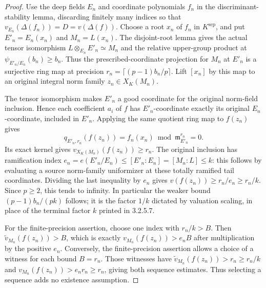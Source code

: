 \begin{proof}
Use the deep fields $E_n$ and coordinate polynomials $f_n$ in the
discriminant-stability lemma, discarding finitely many indices so that
$v_{E_n}(\Delta(f_n))=D=v(\Delta(f))$. Choose a root $x_n$ of $f_n$
in $K^{\mathrm{sep}}$, and put $E'_n=E_n(x_n)$ and $M_n=L(x_n)$.
The disjoint-root lemma gives the actual tensor isomorphism
$L\otimes_{E_n}E'_n\simeq M_n$ and the relative upper-group product
at $\psi_{E'_n/E_n}(b_n)\geq b_n$. Thus the prescribed-coordinate
projection for $M_n$ at $E'_n$ is a surjective ring map at precision
$r_n=\lceil(p-1)b_n/p\rceil$. Lift $[x_n]$ by this map to an original
integral norm family $z_n\in X_K(M_n)$.

The tensor isomorphism makes $E'_n$ a good coordinate for the
original norm-field inclusion. Hence each coefficient $a_i$ of $f$
has $E'_n$-coordinate exactly its original $E_n$-coordinate, included
in $E'_n$. Applying the same quotient ring map to $f(z_n)$ gives
\[
 q_{E'_n,r_n}(f(z_n))=f_n(x_n)\bmod\mathfrak m_{E'_n}^{r_n}=0.
\]
Its exact kernel gives $v_{X_K(M_n)}(f(z_n))\geq r_n$.
The original inclusion has ramification index
$e_n=e(E'_n/E_n)\leq[E'_n:E_n]=[M_n:L]\leq k$:
this follows by evaluating a source norm-family uniformizer at these
totally ramified tail coordinates. Dividing the last inequality by
$e_n$ gives $v(f(z_n))\geq r_n/e_n\geq r_n/k$.
Since $p\geq2$, this tends to infinity. In particular the weaker
bound $(p-1)b_n/(pk)$ follows; it is the factor $1/k$ dictated by
valuation scaling, in place of the terminal factor $k$ printed in
3.2.5.7.

For the finite-precision assertion, choose one index with $r_n/k>B$.
Then $\widetilde v_{M_n}(f(z_n))>B$, which is exactly
$v_{M_n}(f(z_n))>e_nB$ after multiplication by the positive $e_n$.
Conversely, the finite-precision assertion allows a choice of a witness
for each bound $B=r_n$. Those witnesses have
$\widetilde v_{M_n}(f(z_n))>r_n\geq r_n/k$ and
$v_{M_n}(f(z_n))>e_n r_n\geq r_n$, giving both sequence estimates.
Thus selecting a sequence adds no existence assumption.
\end{proof}

